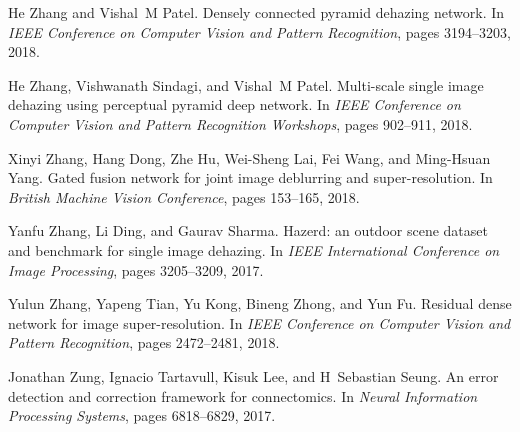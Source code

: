 \documentclass[10pt,twocolumn,letterpaper]{article}
\begin{document}
\begin{thebibliography}{10}
He Zhang and Vishal~M Patel.
\newblock Densely connected pyramid dehazing network.
\newblock In {\em IEEE Conference on Computer Vision and Pattern Recognition},
  pages 3194--3203, 2018.

He Zhang, Vishwanath Sindagi, and Vishal~M Patel.
\newblock Multi-scale single image dehazing using perceptual pyramid deep
  network.
\newblock In {\em IEEE Conference on Computer Vision and Pattern Recognition
  Workshops}, pages 902--911, 2018.

Xinyi Zhang, Hang Dong, Zhe Hu, Wei-Sheng Lai, Fei Wang, and Ming-Hsuan Yang.
\newblock Gated fusion network for joint image deblurring and super-resolution.
\newblock In {\em British Machine Vision Conference}, pages 153--165, 2018.

Yanfu Zhang, Li Ding, and Gaurav Sharma.
\newblock Hazerd: an outdoor scene dataset and benchmark for single image
  dehazing.
\newblock In {\em IEEE International Conference on Image Processing}, pages
  3205--3209, 2017.

Yulun Zhang, Yapeng Tian, Yu Kong, Bineng Zhong, and Yun Fu.
\newblock Residual dense network for image super-resolution.
\newblock In {\em IEEE Conference on Computer Vision and Pattern Recognition},
  pages 2472--2481, 2018.

Jonathan Zung, Ignacio Tartavull, Kisuk Lee, and H~Sebastian Seung.
\newblock An error detection and correction framework for connectomics.
\newblock In {\em Neural Information Processing Systems}, pages 6818--6829,
  2017.

\end{thebibliography}
 
\end{document}
